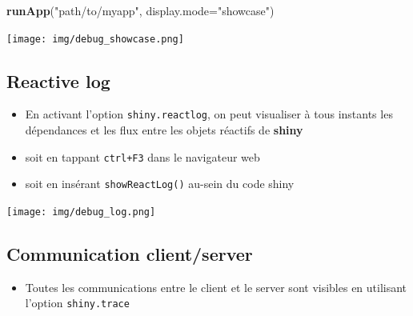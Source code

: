 \documentclass[
]{article}
\newenvironment{Shaded}{\begin{snugshade}}{\end{snugshade}}
\newcommand{\AttributeTok}[1]{\textcolor[rgb]{0.13,0.29,0.53}{#1}}
\newcommand{\CommentTok}[1]{\textcolor[rgb]{0.56,0.35,0.01}{\textit{#1}}}
\newcommand{\ConstantTok}[1]{\textcolor[rgb]{0.56,0.35,0.01}{#1}}
\newcommand{\FunctionTok}[1]{\textcolor[rgb]{0.13,0.29,0.53}{\textbf{#1}}}
\newcommand{\NormalTok}[1]{#1}
\newcommand{\OtherTok}[1]{\textcolor[rgb]{0.56,0.35,0.01}{#1}}
\newcommand{\SpecialCharTok}[1]{\textcolor[rgb]{0.81,0.36,0.00}{\textbf{#1}}}
\newcommand{\StringTok}[1]{\textcolor[rgb]{0.31,0.60,0.02}{#1}}
\providecommand{\tightlist}{%
  \setlength{\itemsep}{0pt}\setlength{\parskip}{0pt}}
\begin{document}
\begin{Shaded}
\begin{Highlighting}[]
\FunctionTok{runApp}\NormalTok{(}\StringTok{"path/to/myapp"}\NormalTok{, }\AttributeTok{display.mode=}\StringTok{"showcase"}\NormalTok{)}
\end{Highlighting}
\end{Shaded}

\texttt{[image: img/debug\_showcase.png]}

\hypertarget{reactive-log}{%
\subsection{Reactive log}\label{reactive-log}}

\begin{itemize}
\tightlist
\item
  En activant l'option \texttt{shiny.reactlog}, on peut visualiser à
  tous instants les dépendances et les flux entre les objets réactifs de
  \textbf{shiny}
\item
  soit en tappant \texttt{ctrl+F3} dans le navigateur web
\item
  soit en insérant \texttt{showReactLog()} au-sein du code shiny
\end{itemize}

\begin{Shaded}
\end{Shaded}

\texttt{[image: img/debug\_log.png]}

\hypertarget{communication-clientserver}{%
\subsection{Communication
client/server}\label{communication-clientserver}}

\begin{itemize}
\tightlist
\item
  Toutes les communications entre le client et le server sont visibles
  en utilisant l'option \texttt{shiny.trace}
\end{itemize}
\end{document}
